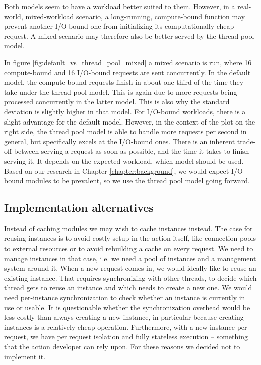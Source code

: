 Both models seem to have a workload better suited to them. However, in a real-world, mixed-workload scenario, a long-running, compute-bound function may prevent another I/O-bound one from initializing its computationally cheap request. A mixed scenario may therefore also be better served by the thread pool model.

In figure \ref{fig:default_vs_thread_pool_mixed} a mixed scenario is run, where 16 compute-bound and 16 I/O-bound requests are sent concurrently. In the default model, the compute-bound requests finish in about one third of the time they take under the thread pool model. This is again due to more requests being processed concurrently in the latter model. This is also why the standard deviation is slightly higher in that model. For I/O-bound workloads, there is a slight advantage for the default model. However, in the context of the plot on the right side, the thread pool model is able to handle more requests per second in general, but specifically excels at the I/O-bound ones. There is an inherent trade-off between serving a request as soon as possible, and the time it takes to finish serving it. It depends on the expected workload, which model should be used. Based on our research in Chapter \ref{chapter:background}, we would expect I/O-bound modules to be prevalent, so we use the thread pool model going forward.


\subsection{Implementation alternatives}

Instead of caching modules we may wish to cache instances instead. The case for reusing instances is to avoid costly setup in the action itself, like connection pools to external resources or to avoid rebuilding a cache on every request.
We need to manage instances in that case, i.e. we need a pool of instances and a management system around it. When a new request comes in, we would ideally like to reuse an existing instance. That requires synchronizing with other threads, to decide which thread gets to reuse an instance and which needs to create a new one. We would need per-instance synchronization to check whether an instance is currently in use or usable. It is questionable whether the synchronization overhead would be less costly than always creating a new instance, in particular because creating instances is a relatively cheap operation. 
Furthermore, with a new instance per request, we have per request isolation and fully stateless execution -- something that the action developer can rely upon. For these reasons we decided not to implement it.

